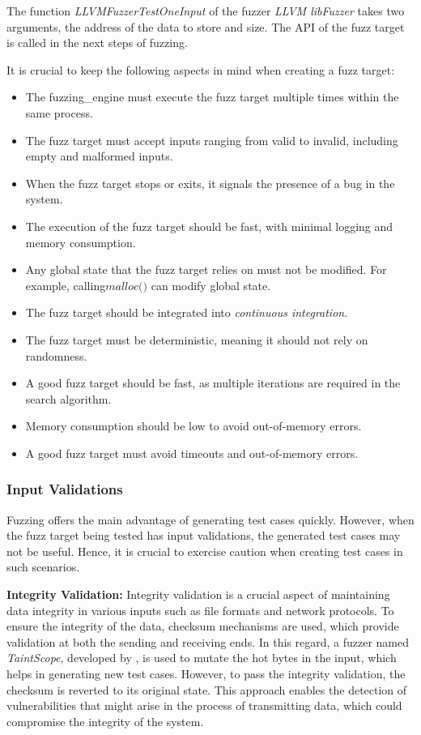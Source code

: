 The function \textit{LLVMFuzzerTestOneInput} of the fuzzer \textit{LLVM libFuzzer} takes two arguments,
the address of the data to store and size. The API of the fuzz target is called in the next steps of
fuzzing.

It is crucial to keep the following aspects in mind when creating a fuzz target\cite{libFuzze17:online}:

\begin{itemize}
        \item The \gls{fuzzing_engine} must execute the fuzz target multiple times within the same process.
        \item The fuzz target must accept inputs ranging from valid to invalid, including empty and malformed inputs.
        \item When the fuzz target stops or exits, it signals the presence of a bug in the system.
        \item The execution of the fuzz target should be fast, with minimal logging and memory consumption.
        \item Any global state that the fuzz target relies on must not be modified. For example,
        calling\begin{math} \textit{malloc()}\end{math} can modify global state.
        \item The fuzz target should be integrated into \textit{continuous integration}.
        \item The fuzz target must be deterministic, meaning it should not rely on randomness.
        \item A good fuzz target should be fast, as multiple iterations are required in the search algorithm.
        \item Memory consumption should be low to avoid out-of-memory errors.
        \item A good fuzz target must avoid timeouts and out-of-memory errors.
\end{itemize}

\subsubsection{Input Validations}
Fuzzing offers the main advantage of generating test cases quickly. However, when the fuzz target
being tested has input validations, the generated test cases may not be useful. Hence, it is
crucial to exercise caution when creating test cases in such scenarios.

\textbf{Integrity Validation:}
Integrity validation is a crucial aspect of maintaining data integrity in various inputs
such as file formats and network protocols. To ensure the integrity of the data,
checksum mechanisms are used, which provide validation at both the sending and receiving ends.
In this regard, a fuzzer named \textit{TaintScope}, developed by \citeauthor{wang2010taintscope},
is used to mutate the hot bytes in the input, which helps in generating new test cases. However, to pass the
integrity validation, the checksum is reverted to its original state. This approach enables
the detection of vulnerabilities that might arise in the process of transmitting data,
which could compromise the integrity of the system\cite{wang2010taintscope}.

